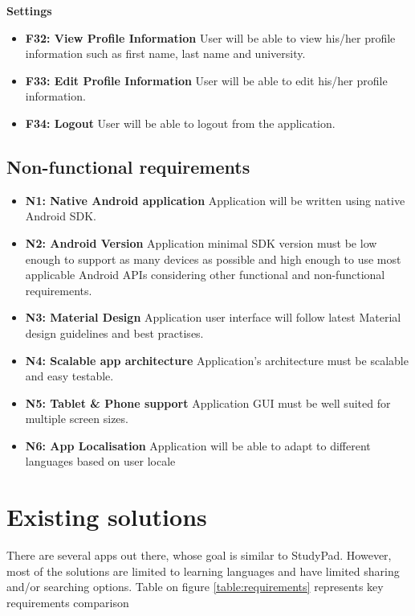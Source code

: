 \documentclass[thesis=B,english]{FITthesis}[2012/10/20]
\newcommand{\appname}{StudyPad}
\begin{document}
\bigskip
\textbf{Settings}
\begin{itemize}
	\item \textbf{F32: View Profile Information} User will be able to view his/her profile information such as first name, last name and  university.
	\item \textbf{F33: Edit Profile Information} User will be able to edit his/her profile information.
	\item \textbf{F34: Logout} User will be able to logout from the application.
\end{itemize}


\subsection{Non-functional requirements}

\begin{itemize}
  \item \textbf{N1: Native Android application}  Application will be written using native Android SDK.
  \item \textbf{N2: Android Version} Application minimal SDK version must be low enough to support as many devices as possible and high enough to use most applicable  Android APIs considering other functional and non-functional requirements.
  \item \textbf{N3: Material Design} Application user interface will follow latest Material design guidelines and best practises.
  \item \textbf{N4: Scalable app architecture} Application's architecture must be scalable and easy testable.
  \item \textbf{N5: Tablet \& Phone support} Application GUI must be well suited for multiple screen sizes.
  \item \textbf{N6: App Localisation} Application will be able to adapt to different languages based on user locale
\end{itemize}


\newpage

\section{Existing solutions}

There are several apps out there, whose goal is similar to \appname. However, most of the solutions are limited to learning languages and have limited sharing and/or searching options. Table on figure \ref{table:requirements} represents key requirements comparison
\end{document}

